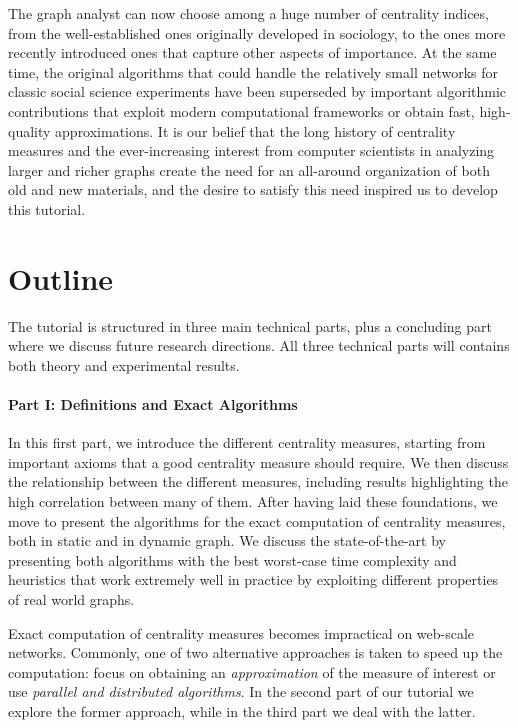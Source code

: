 \documentclass[pdfpagelabels=false]{sig-alternate-2013} %
\begin{document}
The graph analyst can now choose among a huge number of centrality indices, from
the well-established ones originally developed in sociology, to the ones more
recently introduced ones that capture other aspects of importance.  At the same
time, the original algorithms that could handle the relatively small networks
for classic social science experiments have been superseded by important
algorithmic contributions that exploit modern computational frameworks or
obtain fast, high-quality approximations. It is our belief that the long history of
centrality measures and the ever-increasing interest from computer
scientists in analyzing larger and richer graphs create the need for an
all-around organization of both old and new materials, and the desire to
satisfy this need inspired us to develop this tutorial.

\pagebreak
\section{Outline}
The tutorial is structured in three main technical parts, plus a concluding part
where we discuss future research directions. All three technical parts will
contains both theory and experimental results.

\paragraph{Part I: Definitions and Exact Algorithms}
In this first part, we introduce the different centrality measures, starting
from important axioms that a good centrality measure should require. We then
discuss the relationship between the different measures, including
results highlighting the high correlation between many of them. After having
laid these foundations, we move to present the algorithms for the exact
computation of centrality measures, both in static and in dynamic graph. We
discuss the state-of-the-art by presenting both algorithms with the best
worst-case time complexity and heuristics that work extremely well in practice
by exploiting different properties of real world graphs.

Exact computation of centrality measures becomes impractical on web-scale
networks. Commonly, one of two alternative approaches is taken to speed up the
computation: focus on obtaining an \emph{approximation} of the measure of
interest or use \emph{parallel and distributed algorithms}. In the second
part of our tutorial we explore the former approach, while in the third part we
deal with the latter.
\end{document}
